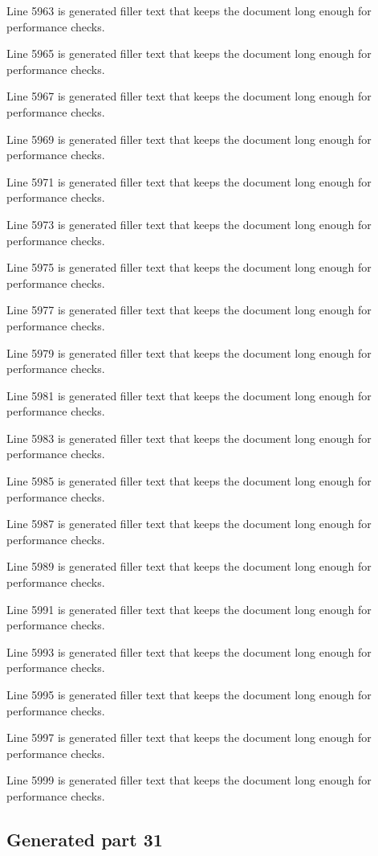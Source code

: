 Line 5963 is generated filler text that keeps the document long enough for performance checks.

Line 5965 is generated filler text that keeps the document long enough for performance checks.

Line 5967 is generated filler text that keeps the document long enough for performance checks.

Line 5969 is generated filler text that keeps the document long enough for performance checks.

Line 5971 is generated filler text that keeps the document long enough for performance checks.

Line 5973 is generated filler text that keeps the document long enough for performance checks.

Line 5975 is generated filler text that keeps the document long enough for performance checks.

Line 5977 is generated filler text that keeps the document long enough for performance checks.

Line 5979 is generated filler text that keeps the document long enough for performance checks.

Line 5981 is generated filler text that keeps the document long enough for performance checks.

Line 5983 is generated filler text that keeps the document long enough for performance checks.

Line 5985 is generated filler text that keeps the document long enough for performance checks.

Line 5987 is generated filler text that keeps the document long enough for performance checks.

Line 5989 is generated filler text that keeps the document long enough for performance checks.

Line 5991 is generated filler text that keeps the document long enough for performance checks.

Line 5993 is generated filler text that keeps the document long enough for performance checks.

Line 5995 is generated filler text that keeps the document long enough for performance checks.

Line 5997 is generated filler text that keeps the document long enough for performance checks.

Line 5999 is generated filler text that keeps the document long enough for performance checks.

\subsection{Generated part 31}

